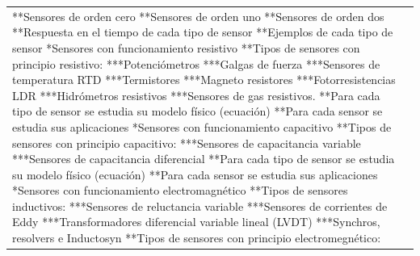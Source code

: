 \documentclass[letterpaper]{article}%
\begin{document}
\begin{longtable}{p{}p{}}
\newline%
**Sensores de orden cero 
\newline%
**Sensores de orden uno 
\newline%
**Sensores de orden dos 
\newline%
**Respuesta en el tiempo  de cada tipo de sensor
\newline%
**Ejemplos de cada tipo de sensor
\newline%
*Sensores con funcionamiento resistivo
\newline%
**Tipos de sensores con principio resistivo:
\newline%
***Potenciómetros
\newline%
***Galgas de fuerza
\newline%
***Sensores de temperatura RTD
\newline%
***Termistores
\newline%
***Magneto resistores
\newline%
***Fotorresistencias LDR
\newline%
***Hidrómetros resistivos
\newline%
***Sensores de gas resistivos.
\newline%
**Para cada tipo de sensor se estudia su modelo físico (ecuación)
\newline%
**Para cada sensor se estudia sus aplicaciones
\newline%
*Sensores con funcionamiento capacitivo
\newline%
**Tipos de sensores con principio capacitivo:
\newline%
***Sensores de capacitancia variable
\newline%
***Sensores de capacitancia diferencial
\newline%
**Para cada tipo de sensor se estudia su modelo físico (ecuación)
\newline%
**Para cada sensor se estudia sus aplicaciones
\newline%
*Sensores con funcionamiento electromagnético
\newline%
**Tipos de sensores inductivos:
\newline%
***Sensores de reluctancia variable
\newline%
***Sensores de corrientes de Eddy
\newline%
***Transformadores diferencial variable lineal (LVDT)
\newline%
***Synchros, resolvers e Inductosyn
\newline%
**Tipos de sensores con principio electromegnético:

\end{longtable}
\end{document}
